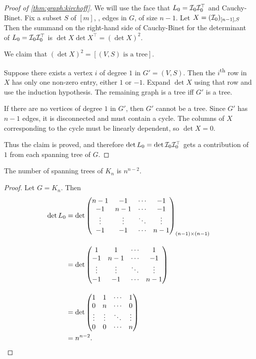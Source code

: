 \begin{proof}[Proof of \cref{thm:graph:kirchoff}]
    We will use the face that $L_0 = \mathcal{I}_0 \mathcal{I}_0^\top$ and Cauchy-Binet.
    Fix a subset $S$ of $[m]$, \ie, edges in $G$, of size $n-1$.
    Let $X = (\mathcal{I}_0)_{[n-1], S}$
    Then the summand on the right-hand side of Cauchy-Binet for
    the determinant of $L_0 = \mathcal{I}_0 \mathcal{I}_0^\top$ is
    $\det X \det X^\top = (\det X)^2$.

    We claim that $(\det X)^2 = [(V, S) \text{ is a tree}]$.

    Suppose there exists a vertex $i$ of degree $1$ in $G' = (V, S)$.
    Then the $i$\textsuperscript{th} row in $X$ has only one non-zero
    entry, either $1$ or $-1$.
    Expand $\det X$ using that row and use the induction hypothesis.
    The remaining graph is a tree iff $G'$ is a tree.

    If there are no vertices of degree $1$ in $G'$, then $G'$ cannot be
    a tree.
    Since $G'$ has $n - 1$ edges, it is disconnected and must contain a
    cycle.
    The columns of $X$ corresponding to the cycle must be linearly
    dependent, so $\det X = 0$.

    Thus the claim is proved, and therefore
    $\det L_0 = \det \mathcal{I}_0 \mathcal{I}_0^\top$ gets a contribution of $1$ from
    each spanning tree of $G$.
\end{proof}
\begin{corollary*} \label{thm:graph:cayley}
    The number of spanning trees of $K_n$ is $n^{n-2}$.
\end{corollary*}
\begin{proof}
    Let $G = K_n$.
    Then \begin{align*}
        \det L_0 &= \det \begin{pmatrix}
            n-1 & -1 & \cdots & -1 \\
            -1 & n-1 & \cdots & -1 \\
            \vdots & \vdots & \ddots & \vdots \\
            -1 & -1 & \cdots & n-1
        \end{pmatrix}_{(n-1) \times (n-1)} \\[1em]
        &= \det \begin{pmatrix}
            1 & 1 & \cdots & 1 \\
            -1 & n-1 & \cdots & -1 \\
            \vdots & \vdots & \ddots & \vdots \\
            -1 & -1 & \cdots & n-1
        \end{pmatrix} \\[1em]
        &= \det \begin{pmatrix}
            1 & 1 & \cdots & 1 \\
            0 & n & \cdots & 0 \\
            \vdots & \vdots & \ddots & \vdots \\
            0 & 0 & \cdots & n
        \end{pmatrix} \\
        &= n^{n-2}. \qedhere
    \end{align*}
\end{proof}
